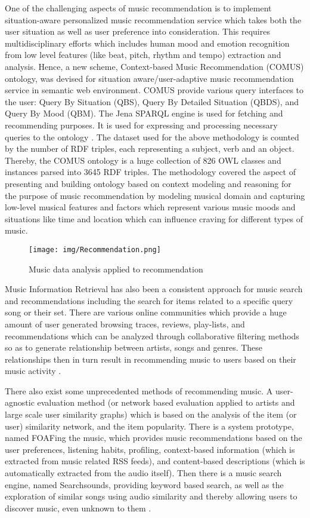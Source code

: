 \documentclass{proc}
\begin{document}
One of the challenging aspects of music recommendation is to implement situation-aware personalized music recommendation service which takes both the user situation as well as user preference into consideration. This requires multidisciplinary efforts which includes human mood and emotion recognition from low level features (like beat, pitch, rhythm and tempo) extraction and analysis. Hence, a new scheme, Context-based Music Recommendation (COMUS) ontology, was devised for situation aware/user-adaptive music recommendation service in semantic web environment. 
COMUS provide various query interfaces to the user: Query By Situation (QBS), Query By Detailed Situation (QBDS), and Query By Mood (QBM). The Jena SPARQL engine is used for fetching and recommending purposes. It is used for expressing and processing necessary queries to the ontology \cite{Rho2011}. The dataset used for the above methodology is counted by the number of RDF triples, each representing a subject, verb and an object. Thereby, the COMUS ontology is a huge collection of 826 OWL classes and instances parsed into 3645 RDF triples. The methodology covered the aspect of presenting and building ontology based on context modeling and reasoning for the purpose of music recommendation by modeling musical domain and capturing low-level musical features and factors which represent various music moods and situations like time and location which can influence craving for different types of music. 
\begin{figure*}
	\centering
		\texttt{[image: img/Recommendation.png]}
	\caption{Music data analysis applied to recommendation}
	\label{fig:Recommendation}
\end{figure*}

Music Information Retrieval has also been a consistent approach for music search and recommendations including the search for items related to a specific query song or their set. There are various online communities which provide a huge amount of user generated browsing traces, reviews, play-lists, and recommendations which can be analyzed through collaborative filtering methods so as to generate relationship between artists, songs and genres. These relationships then in turn result in recommending music to users based on their music activity  \cite{Brandenburg2009}.

There also exist some unprecedented methods of recommending music. A user-agnostic evaluation method (or network based evaluation applied to artists and large scale user similarity graphs) which is based on the analysis of the item (or user) similarity network, and the item popularity. 
There is a system prototype, named FOAFing the music, which provides music recommendations based on the user preferences, listening habits, profiling, context-based information (which is extracted from music related RSS feeds), and content-based descriptions (which is automatically extracted from the audio itself). Then there is a music search engine, named Searchsounds, providing keyword based search, as well as the exploration of similar songs using audio similarity and thereby allowing users to discover music, even unknown  to them  \cite{Herrada2008}. 
\end{document}

